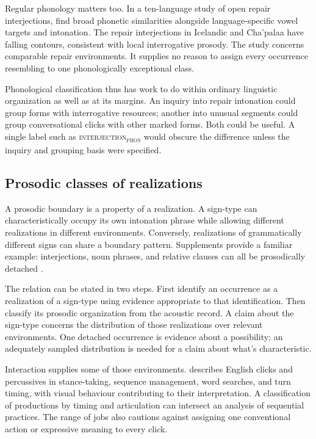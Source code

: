 \documentclass[12pt]{article}
\newcommand{\intj}[1]{\textsc{interjection\textsubscript{#1}}}
\begin{document}
Regular phonology matters too. In a ten-language study of open repair
interjections, \textcite{dingemanse2013huh} find broad phonetic similarities
alongside language-specific vowel targets and intonation. The repair interjections in Icelandic and
Cha'palaa have falling contours, consistent with local interrogative
prosody. The study concerns comparable repair environments. It supplies
no reason to assign every occurrence resembling  to one
phonologically exceptional class.

Phonological classification thus has work to do within ordinary linguistic
organization as well as at its margins. An inquiry into repair intonation
could group forms with interrogative resources; another into unusual
segments could group conversational clicks with other marked forms.
Both could be useful. A single label such as \intj{phon} would obscure
the difference unless the inquiry and grouping basis were specified.

\subsection{Prosodic classes of realizations}

A prosodic boundary is a property of a realization. A sign-type can
characteristically occupy its own intonation phrase while allowing different
realizations in different environments. Conversely, realizations of
grammatically different signs can share a boundary pattern. Supplements
provide a familiar example: interjections, noun phrases, and relative
clauses can all be prosodically detached
\citep[66, 1350]{HuddlestonPullum2002}.

The relation can be stated in two steps. First identify an occurrence
as a realization of a sign-type using evidence appropriate to that
identification. Then classify its prosodic organization from the acoustic
record. A claim about the sign-type concerns the distribution of those
realizations over relevant environments. One detached occurrence is
evidence about a possibility; an adequately sampled distribution is needed
for a claim about what's characteristic.

Interaction supplies some of those environments. \textcite{ogden2013clicks} describes English
clicks and percussives in stance-taking, sequence management, word searches,
and turn timing, with visual behaviour contributing to their interpretation. A classification of productions by timing and
articulation can intersect an analysis of sequential practices.
The range of jobs also cautions against assigning one conventional action
or expressive meaning to every click.
\end{document}
